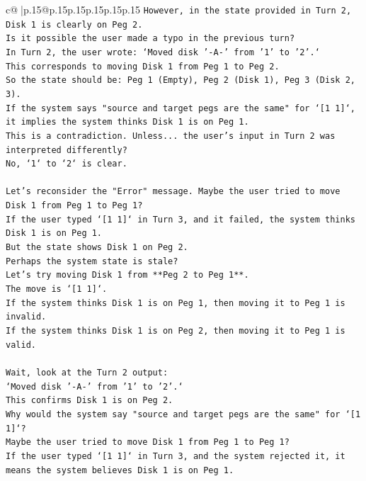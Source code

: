 \documentclass{article}
\begin{document}
{\begin{supertabular}{c@{$\;$}|p{.15\linewidth}@{}p{.15\linewidth}p{.15\linewidth}p{.15\linewidth}p{.15\linewidth}p{.15\linewidth}}
{{{\texttt{However, in the state provided in Turn 2, Disk 1 is clearly on Peg 2.} \\
\texttt{Is it possible the user made a typo in the previous turn?} \\
\texttt{In Turn 2, the user wrote: `Moved disk '{-}A{-}' from '1' to '2'.`} \\
\texttt{This corresponds to moving Disk 1 from Peg 1 to Peg 2.} \\
\texttt{So the state should be: Peg 1 (Empty), Peg 2 (Disk 1), Peg 3 (Disk 2, 3).} \\
\texttt{If the system says "source and target pegs are the same" for `{[}1 1{]}`, it implies the system thinks Disk 1 is on Peg 1.} \\
\texttt{This is a contradiction. Unless... the user's input in Turn 2 was interpreted differently?} \\
\texttt{No, `1` to `2` is clear.} \\
\\ 
\texttt{Let's reconsider the "Error" message. Maybe the user tried to move Disk 1 from Peg 1 to Peg 1?} \\
\texttt{If the user typed `{[}1 1{]}` in Turn 3, and it failed, the system thinks Disk 1 is on Peg 1.} \\
\texttt{But the state shows Disk 1 on Peg 2.} \\
\texttt{Perhaps the system state is stale?} \\
\texttt{Let's try moving Disk 1 from **Peg 2 to Peg 1**.} \\
\texttt{The move is `{[}1 1{]}`.} \\
\texttt{If the system thinks Disk 1 is on Peg 1, then moving it to Peg 1 is invalid.} \\
\texttt{If the system thinks Disk 1 is on Peg 2, then moving it to Peg 1 is valid.} \\
\\ 
\texttt{Wait, look at the Turn 2 output:} \\
\texttt{`Moved disk '{-}A{-}' from '1' to '2'.`} \\
\texttt{This confirms Disk 1 is on Peg 2.} \\
\texttt{Why would the system say "source and target pegs are the same" for `{[}1 1{]}`?} \\
\texttt{Maybe the user tried to move Disk 1 from Peg 1 to Peg 1?} \\
\texttt{If the user typed `{[}1 1{]}` in Turn 3, and the system rejected it, it means the system believes Disk 1 is on Peg 1.} \\
}}}
\end{supertabular}}
\end{document}
